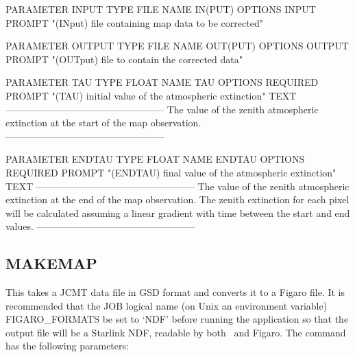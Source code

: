 \documentclass[twoside,11pt,nolof]{starlink}
\providecommand{\Kappa}{\xref{{\sc{Kappa}}}{sun95}{}}
\begin{document}
\begin{small}
\begin{terminalv}
PARAMETER  INPUT
  TYPE    FILE
  NAME    IN(PUT)
  OPTIONS INPUT
  PROMPT  "(INput) file containing map data to be corrected"

PARAMETER  OUTPUT
  TYPE    FILE
  NAME    OUT(PUT)
  OPTIONS OUTPUT
  PROMPT  "(OUTput) file to contain the corrected data"

PARAMETER  TAU
  TYPE    FLOAT
  NAME    TAU
  OPTIONS REQUIRED
  PROMPT  "(TAU) initial value of the atmospheric extinction"
  TEXT    --------------------------------------------------
          The value of the zenith atmospheric extinction at
          the start of the map observation.
          --------------------------------------------------

PARAMETER  ENDTAU
  TYPE    FLOAT
  NAME    ENDTAU
  OPTIONS REQUIRED
  PROMPT  "(ENDTAU) final value of the atmospheric extinction"
  TEXT    --------------------------------------------------
          The value of the zenith atmospheric extinction at
          the end of the map observation. The zenith extinction
          for each pixel will be calculated assuming a linear
          gradient with time between the start and end values.
          --------------------------------------------------
\end{terminalv}
\end{small}


\goodbreak

\subsection{MAKEMAP}

This takes a JCMT data file in GSD format and converts it to a Figaro
file. It is recommended that the JOB logical name (on Unix an
environment variable) FIGARO\_FORMATS be
set  to `NDF' before running the application so that the output file
will be a Starlink NDF, readable by both \Kappa\ and Figaro. The command
has the following parameters:

\goodbreak
\end{document}
